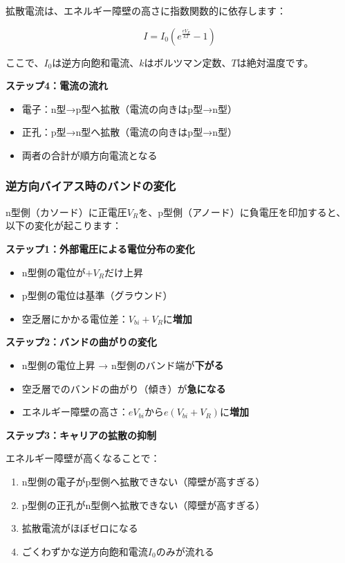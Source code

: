拡散電流は、エネルギー障壁の高さに指数関数的に依存します：

\begin{equation}
I = I_0 \left( e^{\frac{eV_F}{kT}} - 1 \right)
\end{equation}

ここで、$I_0$は逆方向飽和電流、$k$はボルツマン定数、$T$は絶対温度です。

\textbf{ステップ4：電流の流れ}

\begin{itemize}
\item 電子：n型→p型へ拡散（電流の向きはp型→n型）
\item 正孔：p型→n型へ拡散（電流の向きはp型→n型）
\item 両者の合計が順方向電流となる
\end{itemize}

\subsubsection{逆方向バイアス時のバンドの変化}

n型側（カソード）に正電圧$V_R$を、p型側（アノード）に負電圧を印加すると、以下の変化が起こります：

\textbf{ステップ1：外部電圧による電位分布の変化}

\begin{itemize}
\item n型側の電位が$+V_R$だけ上昇
\item p型側の電位は基準（グラウンド）
\item 空乏層にかかる電位差：$V_{bi} + V_R$に\textbf{増加}
\end{itemize}

\textbf{ステップ2：バンドの曲がりの変化}

\begin{itemize}
\item n型側の電位上昇 → n型側のバンド端が\textbf{下がる}
\item 空乏層でのバンドの曲がり（傾き）が\textbf{急になる}
\item エネルギー障壁の高さ：$eV_{bi}$から$e(V_{bi} + V_R)$に\textbf{増加}
\end{itemize}

\textbf{ステップ3：キャリアの拡散の抑制}

エネルギー障壁が高くなることで：

\begin{enumerate}
\item n型側の電子がp型側へ拡散できない（障壁が高すぎる）
\item p型側の正孔がn型側へ拡散できない（障壁が高すぎる）
\item 拡散電流がほぼゼロになる
\item ごくわずかな逆方向飽和電流$I_0$のみが流れる
\end{enumerate}

